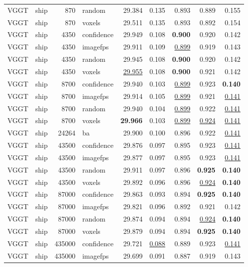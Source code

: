 \begin{table}[H]
\begin{tabular}{llrlrrrrr}
VGGT & ship & 870 & random & 29.384 & 0.135 & 0.893 & 0.889 & 0.155 \\
VGGT & ship & 870 & voxels & 29.511 & 0.135 & 0.893 & 0.892 & 0.154 \\
VGGT & ship & 4350 & confidence & 29.949 & 0.108 & \textbf{0.900} & 0.920 & 0.142 \\
VGGT & ship & 4350 & imagefps & 29.911 & 0.109 & \underline{0.899} & 0.919 & 0.143 \\
VGGT & ship & 4350 & random & 29.945 & 0.108 & \textbf{0.900} & 0.920 & 0.142 \\
VGGT & ship & 4350 & voxels & \underline{29.955} & 0.108 & \textbf{0.900} & 0.921 & 0.142 \\
VGGT & ship & 8700 & confidence & 29.940 & 0.103 & \underline{0.899} & 0.923 & \textbf{0.140} \\
VGGT & ship & 8700 & imagefps & 29.914 & 0.105 & \underline{0.899} & 0.921 & \underline{0.141} \\
VGGT & ship & 8700 & random & 29.940 & 0.104 & \underline{0.899} & 0.922 & \underline{0.141} \\
VGGT & ship & 8700 & voxels & \textbf{29.966} & 0.103 & \underline{0.899} & \underline{0.924} & \underline{0.141} \\
VGGT & ship & 24264 & ba & 29.900 & 0.100 & 0.896 & 0.922 & \underline{0.141} \\
VGGT & ship & 43500 & confidence & 29.876 & 0.097 & 0.895 & 0.923 & \underline{0.141} \\
VGGT & ship & 43500 & imagefps & 29.877 & 0.097 & 0.895 & 0.923 & \underline{0.141} \\
VGGT & ship & 43500 & random & 29.911 & 0.097 & 0.896 & \textbf{0.925} & \textbf{0.140} \\
VGGT & ship & 43500 & voxels & 29.892 & 0.096 & 0.896 & \underline{0.924} & \textbf{0.140} \\
VGGT & ship & 87000 & confidence & 29.863 & 0.093 & 0.894 & \textbf{0.925} & \textbf{0.140} \\
VGGT & ship & 87000 & imagefps & 29.821 & 0.096 & 0.892 & 0.921 & 0.142 \\
VGGT & ship & 87000 & random & 29.874 & 0.094 & 0.894 & \underline{0.924} & \textbf{0.140} \\
VGGT & ship & 87000 & voxels & 29.879 & 0.094 & 0.894 & \textbf{0.925} & \textbf{0.140} \\
VGGT & ship & 435000 & confidence & 29.721 & \underline{0.088} & 0.889 & 0.923 & \underline{0.141} \\
VGGT & ship & 435000 & imagefps & 29.699 & 0.091 & 0.887 & 0.919 & 0.143 \\

\end{tabular}
\end{table}
